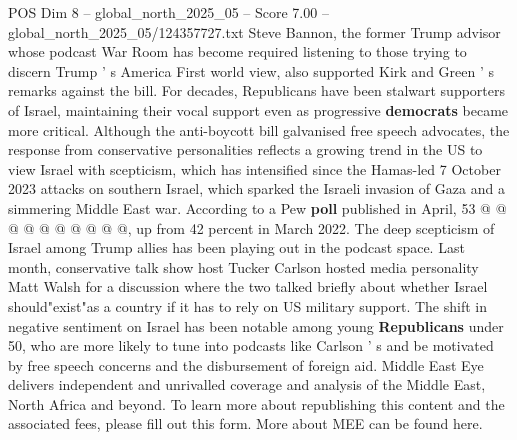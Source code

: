 \begin{textsample}{POS Dim 8 – global\_north\_2025\_05 – Score 7.00 – global\_north\_2025\_05/124357727.txt}
Steve Bannon, the former Trump advisor whose podcast War Room has become required listening to those trying to discern Trump ' s America First world view, also supported Kirk and Green ' s remarks against the bill.
For decades, Republicans have been stalwart supporters of Israel, maintaining their vocal support even as progressive \textbf{democrats} became more critical.
Although the anti-boycott bill galvanised free speech advocates, the response from conservative personalities reflects a growing trend in the US to view Israel with scepticism, which has intensified since the Hamas-led 7 October 2023 attacks on southern Israel, which sparked the Israeli invasion of Gaza and a simmering Middle East war.
According to a Pew \textbf{poll} published in April, 53 @ @ @ @ @ @ @ @ @ @, up from 42 percent in March 2022.
The deep scepticism of Israel among Trump allies has been playing out in the podcast space.
Last month, conservative talk show host Tucker Carlson hosted media personality Matt Walsh for a discussion where the two talked briefly about whether Israel should"exist"as a country if it has to rely on US military support.
The shift in negative sentiment on Israel has been notable among young \textbf{Republicans} under 50, who are more likely to tune into podcasts like Carlson ' s and be motivated by free speech concerns and the disbursement of foreign aid.
Middle East Eye delivers independent and unrivalled coverage and analysis of the Middle East, North Africa and beyond.
To learn more about republishing this content and the associated fees, please fill out this form.
More about MEE can be found here.

\end{textsample}
